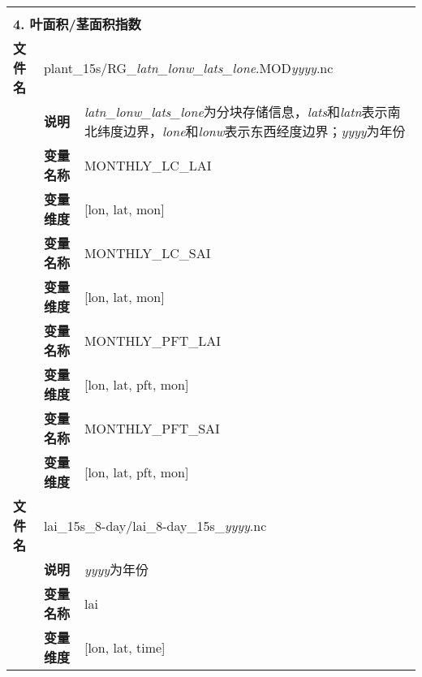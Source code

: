 {\begin{longtable}{llp{}}
\midrule
\vspace{2\baselineskip}\\
\multicolumn{3}{l}{\textbf{4. 叶面积/茎面积指数}} \\
\cline{1-3}
\textbf{文件名} & \multicolumn{2}{l}{plant\_15s/RG\_\textit{latn\_lonw\_lats\_lone}.MOD\textit{yyyy}.nc} \\
& \textbf{说明} & \textit{latn\_lonw\_lats\_lone}为分块存储信息，\textit{lats}和\textit{latn}表示南北纬度边界，\textit{lone}和\textit{lonw}表示东西经度边界；\textit{yyyy}为年份 \\
\cline{2-3}
& \textbf{变量名称} & MONTHLY\_LC\_LAI \\
& \textbf{变量维度} & {[}lon, lat, mon{]} \\
\cline{2-3}
& \textbf{变量名称} & MONTHLY\_LC\_SAI \\
& \textbf{变量维度} & {[}lon, lat, mon{]} \\
\cline{2-3}
& \textbf{变量名称} & MONTHLY\_PFT\_LAI \\
& \textbf{变量维度} & {[}lon, lat, pft, mon{]} \\
\cline{2-3}
& \textbf{变量名称} & MONTHLY\_PFT\_SAI \\
& \textbf{变量维度} & {[}lon, lat, pft, mon{]} \\
\cline{1-3}
\textbf{文件名} & \multicolumn{2}{l}{lai\_15s\_8-day/lai\_8-day\_15s\_\textit{yyyy}.nc} \\
& \textbf{说明} & \textit{yyyy}为年份 \\
\cline{2-3}
& \textbf{变量名称} & lai \\
& \textbf{变量维度} & {[}lon, lat, time{]} \\


\end{longtable}}

